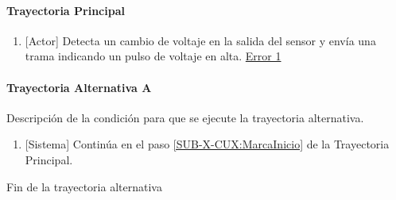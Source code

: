 \paragraph{Trayectoria Principal}
	\begin{enumerate}
		\item \label{SUB-X-CUX:MarcaInicio} {[Actor]} Detecta un cambio de voltaje en la salida del sensor y envía una trama indicando un pulso de voltaje en alta. \hyperref[SUB-M-CU1:Error1]{Error 1} %
	\end{enumerate}

\paragraph{Trayectoria Alternativa A} \label{SUB-M-CU1:TA}
	Descripción de la condición para que se ejecute la trayectoria alternativa.
	\begin{enumerate}[label=A\arabic*.]
		\item {[Sistema]} Continúa en el paso \ref{SUB-X-CUX:MarcaInicio} de la Trayectoria Principal.
	\end{enumerate}
	Fin de la trayectoria alternativa
